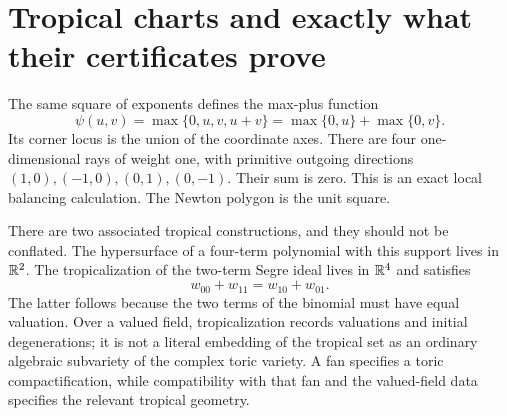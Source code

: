 \section{Tropical charts and exactly what their certificates prove}
The same square of exponents defines the max-plus function
\[
 \psi(u,v)=\max\{0,u,v,u+v\}=\max\{0,u\}+\max\{0,v\}.
\]
Its corner locus is the union of the coordinate axes. There are four
one-dimensional rays of weight one, with primitive outgoing directions
$(1,0),(-1,0),(0,1),(0,-1)$. Their sum is zero. This is an exact local
balancing calculation. The Newton polygon is the unit square.

\begin{center}
\end{center}

There are two associated tropical constructions, and they should not be
conflated. The hypersurface of a four-term polynomial with this support
lives in $\mathbb R^2$. The tropicalization of the two-term Segre ideal lives in
$\mathbb R^4$ and satisfies
\[
 w_{00}+w_{11}=w_{10}+w_{01}.
\]
The latter follows because the two terms of the binomial must have equal
valuation. Over a valued field, tropicalization records valuations and
initial degenerations; it is not a literal embedding of the tropical
set as an ordinary algebraic subvariety of the complex toric variety.
A fan specifies a toric compactification, while compatibility with that
fan and the valued-field data specifies the relevant tropical geometry.

